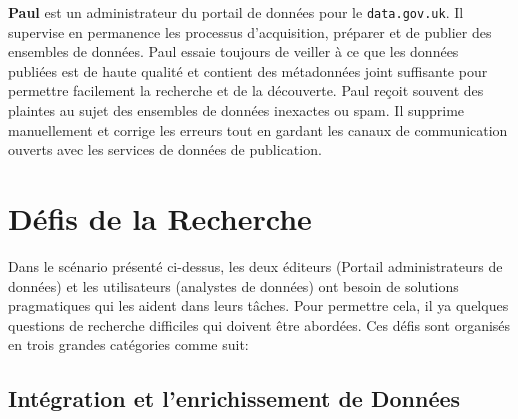 \documentclass[a4paper,11pt,twoside]{ThesisStyle}
\begin{document}
\textbf{Paul} est un administrateur du portail de données pour le \texttt{data.gov.uk}. Il supervise en permanence les processus d'acquisition, préparer et de publier des ensembles de données. Paul essaie toujours de veiller à ce que les données publiées est de haute qualité et contient des métadonnées joint suffisante pour permettre facilement la recherche et de la découverte. Paul reçoit souvent des plaintes au sujet des ensembles de données inexactes ou spam. Il supprime manuellement et corrige les erreurs tout en gardant les canaux de communication ouverts avec les services de données de publication.


\section{Défis de la Recherche} \label{section:challenges}

Dans le scénario présenté ci-dessus, les deux éditeurs (Portail administrateurs de données) et les utilisateurs (analystes de données) ont besoin de solutions pragmatiques qui les aident dans leurs tâches. Pour permettre cela, il ya quelques questions de recherche difficiles qui doivent être abordées. Ces défis sont organisés en trois grandes catégories comme suit:

\subsection{Intégration et l'enrichissement de Données}
\end{document}
